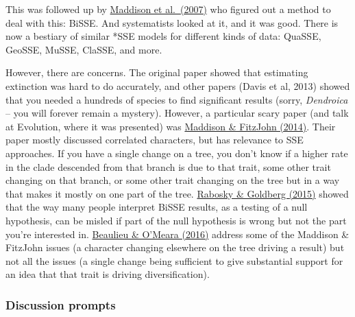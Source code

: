 \documentclass[
]{article}
\begin{document}
This was followed up by \href{http://sysbio.oxfordjournals.org/content/56/5/701.short}{Maddison et al.~(2007)} who figured out a method to deal with this: BiSSE. And systematists looked at it, and it was good. There is now a bestiary of similar *SSE models for different kinds of data: QuaSSE, GeoSSE, MuSSE, ClaSSE, and more.

However, there are concerns. The original paper showed that estimating extinction was hard to do accurately, and other papers (Davis et al, 2013) showed that you needed a hundreds of species to find significant results (sorry, \emph{Dendroica} -- you will forever remain a mystery). However, a particular scary paper (and talk at Evolution, where it was presented) was \href{https://sysbio.oxfordjournals.org/content/early/2014/10/23/sysbio.syu070.full}{Maddison \& FitzJohn (2014)}. Their paper mostly discussed correlated characters, but has relevance to SSE approaches. If you have a single change on a tree, you don't know if a higher rate in the clade descended from that branch is due to that trait, some other trait changing on that branch, or some other trait changing on the tree but in a way that makes it mostly on one part of the tree. \href{http://sysbio.oxfordjournals.org/content/early/2015/01/18/sysbio.syu131}{Rabosky \& Goldberg (2015)} showed that the way many people interpret BiSSE results, as a testing of a null hypothesis, can be misled if part of the null hypothesis is wrong but not the part you're interested in. \href{http://sysbio.oxfordjournals.org/content/early/2016/03/25/sysbio.syw022.abstract}{Beaulieu \& O'Meara (2016)} address some of the Maddison \& FitzJohn issues (a character changing elsewhere on the tree driving a result) but not all the issues (a single change being sufficient to give substantial support for an idea that that trait is driving diversification).

\hypertarget{discussion-prompts}{%
\subsubsection{Discussion prompts}\label{discussion-prompts}}
\end{document}
